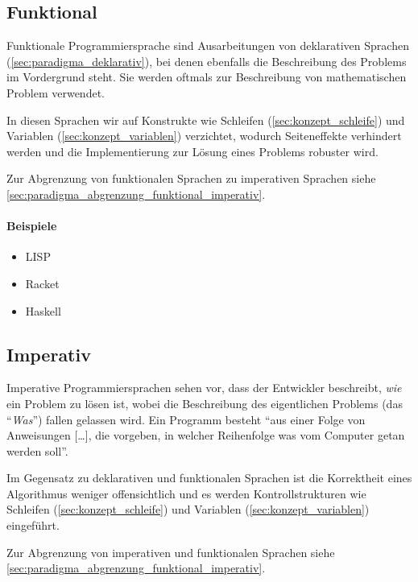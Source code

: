 	\subsection{Funktional}
		\label{sec:paradigma_funktional}
	
		Funktionale Programmiersprache sind Ausarbeitungen von deklarativen Sprachen (\ref{sec:paradigma_deklarativ}), bei denen ebenfalls die Beschreibung des Problems im Vordergrund steht. Sie werden oftmals zur Beschreibung von mathematischen Problem verwendet.
		
		In diesen Sprachen wir auf Konstrukte wie Schleifen (\ref{sec:konzept_schleife}) und Variablen (\ref{sec:konzept_variablen}) verzichtet, wodurch Seiteneffekte  verhindert werden und die Implementierung zur Lösung eines Problems robuster wird.
		
		Zur Abgrenzung von funktionalen Sprachen zu imperativen Sprachen siehe \ref{sec:paradigma_abgrenzung_funktional_imperativ}.
		
		\paragraph{Beispiele}
			\begin{itemize}
				\item LISP
				\item Racket
				\item Haskell
			\end{itemize}
	
	\subsection{Imperativ}
		\label{sec:paradigma_imperativ}
	
		Imperative Programmiersprachen sehen vor, dass der Entwickler beschreibt, \textit{wie} ein Problem zu lösen ist, wobei die Beschreibung des eigentlichen Problems (das \enquote{\textit{Was}}) fallen gelassen wird. Ein Programm besteht \enquote{aus einer Folge von Anweisungen [\dots], die vorgeben, in welcher Reihenfolge was vom Computer getan werden soll}. ~\cite{andreas2005grundkurs}
		
		Im Gegensatz zu deklarativen und funktionalen Sprachen ist die Korrektheit eines Algorithmus weniger offensichtlich und es werden Kontrollstrukturen wie Schleifen (\ref{sec:konzept_schleife}) und Variablen (\ref{sec:konzept_variablen}) eingeführt.
		
		Zur Abgrenzung von imperativen und funktionalen Sprachen siehe \ref{sec:paradigma_abgrenzung_funktional_imperativ}.
		
